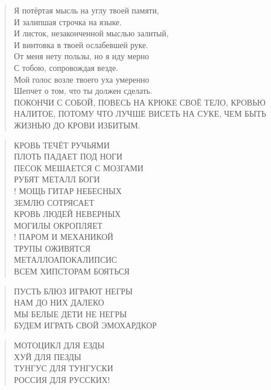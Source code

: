 \poemtitle{***}
\begin{verse}
Я потёртая мысль на углу твоей памяти,\\
И залипшая строчка на языке.\\
И листок, незаконченной мыслью залитый,\\
И винтовка в твоей ослабевшей руке.\\
От меня нету пользы, но я иду мерно\\
С тобою, сопровождая везде.\\
Мой голос возле твоего уха умеренно\\
Шепчет о том, что ты должен сделать.\\
ПОКОНЧИ С СОБОЙ, ПОВЕСЬ НА КРЮКЕ СВОЁ ТЕЛО, КРОВЬЮ НАЛИТОЕ, ПОТОМУ ЧТО ЛУЧШЕ ВИСЕТЬ НА СУКЕ, ЧЕМ БЫТЬ ЖИЗНЬЮ ДО КРОВИ ИЗБИТЫМ.
\end{verse}

\poemtitle{***}
\begin{verse}
КРОВЬ ТЕЧЁТ РУЧЬЯМИ\\
ПЛОТЬ ПАДАЕТ ПОД НОГИ\\
ПЕСОК МЕШАЕТСЯ С МОЗГАМИ\\
РУБЯТ МЕТАЛЛ БОГИ\\!
МОЩЬ ГИТАР НЕБЕСНЫХ\\
ЗЕМЛЮ СОТРЯСАЕТ\\
КРОВЬ ЛЮДЕЙ НЕВЕРНЫХ\\
МОГИЛЫ ОКРОПЛЯЕТ\\!
ПАРОМ И МЕХАНИКОЙ\\
ТРУПЫ ОЖИВЯТСЯ\\
МЕТАЛЛОАПОКАЛИПСИС\\
ВСЕМ ХИПСТОРАМ БОЯТЬСЯ
\end{verse}

\poemtitle{***}
\begin{verse}
ПУСТЬ БЛЮЗ ИГРАЮТ НЕГРЫ\\
НАМ ДО НИХ ДАЛЕКО\\
МЫ БЕЛЫЕ ДЕТИ НЕ НЕГРЫ\\
БУДЕМ ИГРАТЬ СВОЙ ЭМОХАРДКОР
\end{verse}

\poemtitle{***}
\begin{verse}
МОТОЦИКЛ ДЛЯ ЕЗДЫ\\
ХУЙ ДЛЯ ПЕЗДЫ\\
ТУНГУС ДЛЯ ТУНГУСКИ\\
РОССИЯ ДЛЯ РУССКИХ!
\end{verse}

